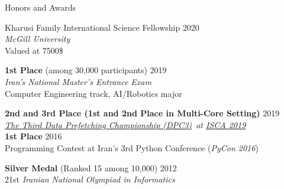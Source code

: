 \documentclass{resume}
\newcommand{\InternalSpace}{\vspace{0.18cm}}
\newcommand{\textapprox}{\raisebox{0.5ex}{\texttildelow}}
\newenvironment{MySection}[1]
{\begin{category}{#1}}
{\end{category}}
\newcommand{\MyItem}{\citembullet}
\def \ISCAXIX {\href{https://iscaconf.org/isca2019/}{ISCA 2019}}
\def \DPCIII  {\href{https://dpc3.compas.cs.stonybrook.edu/}{The Third Data Prefetching Championship (DPC3)}}
\begin{document}
\InternalSpace


\begin{MySection}{Honors and Awards}

\MyItem
Kharusi Family International Science Fellowship \hfill {2020}\\
\emph{McGill University}\\
Valued at 7500\$

\MyItem
\textbf{1st Place} (among \textapprox30,000 participants) \hfill {2019}\\
\emph{Iran's National Master's Entrance Exam}\\
Computer Engineering track, AI/Robotics major

\MyItem
\textbf{2nd and 3rd Place (1st and 2nd Place in Multi-Core Setting)} \hfill {2019}\\
\emph{\DPCIII\ at \ISCAXIX}\\

\MyItem
\textbf{1st Place} \hfill {2016}\\
Programming Contest at Iran's 3rd Python Conference (\emph{PyCon 2016})

\MyItem
\textbf{Silver Medal} (Ranked \textapprox15 among \textapprox10,000) \hfill {2012}\\
21st \emph{Iranian National Olympiad in Informatics}

\end{MySection}

\InternalSpace


\end{document}
